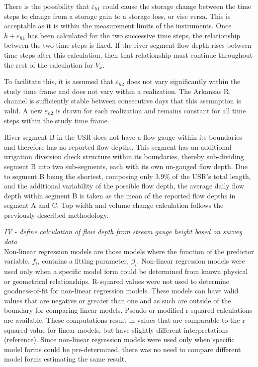 \begin{linenumbers}
There is the possibility that $\varepsilon_{h1}$ could cause the storage change between the time steps to change from a storage gain to a storage loss, or vise versa.  This is acceptable as it is within the measurement limits of the instruments.  Once $h+\varepsilon_{h1}$ has been calculated for the two successive time steps, the relationship between the two time steps is fixed.  If the river segment flow depth rises between time steps after this calculation, then that relationship must continue throughout the rest of the calculation for $V_x$.

To facilitate this, it is assumed that $\varepsilon_{h2}$ does not vary significantly within the study time frame and does not vary within a realization.  The Arkansas R. channel is sufficiently stable between consecutive days that this assumption is valid.  A new $\varepsilon_{h2}$ is drawn for each realization and remains constant for all time steps within the study time frame.

River segment B in the USR does not have a flow gauge within its boundaries and therefore has no reported flow depths. This segment has an additional irrigation diversion check structure within its boundaries, thereby sub-dividing segment B into two sub-segments, each with its own un-gauged flow depth.  Due to segment B being the shortest, composing only 3.9\% of the USR's total length, and the additional variability of the possible flow depth, the average daily flow depth within segment B is taken as the mean of the reported flow depths in segment A and C.  Top width and volume change calculation follows the previously described methodology.

\emph{IV - define calculation of flow depth from stream gauge height based on survey data}\\

Non-linear regression models are those models where the function of the predictor variable, $f_i$, contains a fitting parameter, $\beta_i$.  Non-linear regression models were used only when a specific model form could be determined from known physical or geometrical relationships.  R-squared values were not used to determine goodness-of-fit for non-linear regression models.  These models can have valid values that are negative or greater than one \citep{spiess2010evaluation} and as such are outside of the boundary for comparing linear models.  Pseudo or modified r-squared calculations are available.  These computations result in values that are comparable to the r-squared value for linear models, but have slightly different interpretations (reference).  Since non-linear regression models were used only when specific model forms could be pre-determined, there was no need to compare different model forms estimating the same result.


\end{linenumbers}
